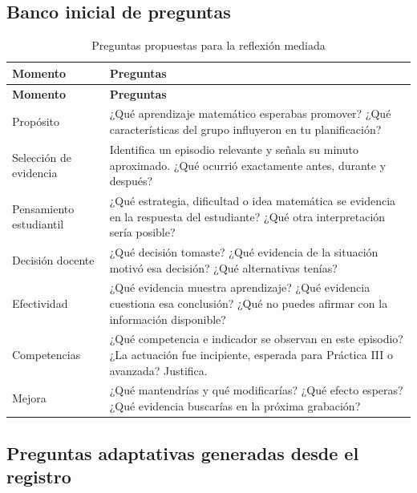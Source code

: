 \documentclass[11pt,a4paper]{article}
\begin{document}
\subsection{Banco inicial de preguntas}

\begin{longtable}{p{3.2cm}p{11.8cm}}
\caption{Preguntas propuestas para la reflexión mediada}\\
\toprule
\textbf{Momento} & \textbf{Preguntas}\\
\midrule
\endfirsthead
\toprule
\textbf{Momento} & \textbf{Preguntas}\\
\midrule
\endhead

Propósito &
¿Qué aprendizaje matemático esperabas promover? ¿Qué características del grupo influyeron en tu planificación?\\
\midrule

Selección de evidencia &
Identifica un episodio relevante y señala su minuto aproximado. ¿Qué ocurrió exactamente antes, durante y después?\\
\midrule

Pensamiento estudiantil &
¿Qué estrategia, dificultad o idea matemática se evidencia en la respuesta del estudiante? ¿Qué otra interpretación sería posible?\\
\midrule

Decisión docente &
¿Qué decisión tomaste? ¿Qué evidencia de la situación motivó esa decisión? ¿Qué alternativas tenías?\\
\midrule

Efectividad &
¿Qué evidencia muestra aprendizaje? ¿Qué evidencia cuestiona esa conclusión? ¿Qué no puedes afirmar con la información disponible?\\
\midrule

Competencias &
¿Qué competencia e indicador se observan en este episodio? ¿La actuación fue incipiente, esperada para Práctica III o avanzada? Justifica.\\
\midrule

Mejora &
¿Qué mantendrías y qué modificarías? ¿Qué efecto esperas? ¿Qué evidencia buscarías en la próxima grabación?\\
\bottomrule
\end{longtable}

\subsection{Preguntas adaptativas generadas desde el registro}
\end{document}
